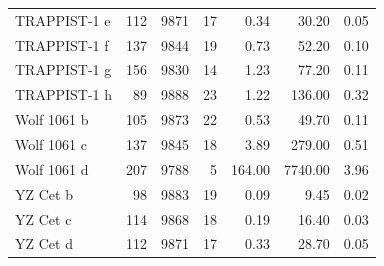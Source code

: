 \begin{table}
\begin{tabular}{lrrrrrr}
TRAPPIST-1 e & 112 & 9871 & 17 & 0.34 & 30.20 & 0.05 \\
TRAPPIST-1 f & 137 & 9844 & 19 & 0.73 & 52.20 & 0.10 \\
TRAPPIST-1 g & 156 & 9830 & 14 & 1.23 & 77.20 & 0.11 \\
TRAPPIST-1 h & 89 & 9888 & 23 & 1.22 & 136.00 & 0.32 \\
Wolf 1061 b & 105 & 9873 & 22 & 0.53 & 49.70 & 0.11 \\
Wolf 1061 c & 137 & 9845 & 18 & 3.89 & 279.00 & 0.51 \\
Wolf 1061 d & 207 & 9788 & 5 & 164.00 & 7740.00 & 3.96 \\
YZ Cet b & 98 & 9883 & 19 & 0.09 & 9.45 & 0.02 \\
YZ Cet c & 114 & 9868 & 18 & 0.19 & 16.40 & 0.03 \\
YZ Cet d & 112 & 9871 & 17 & 0.33 & 28.70 & 0.05 \\
\bottomrule
\end{tabular}
\end{table}
